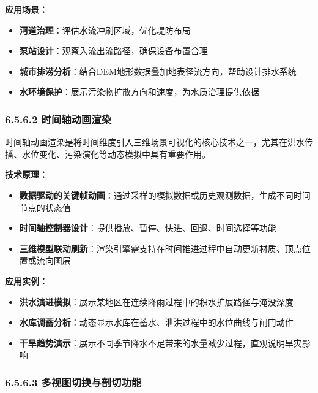 \textbf{应用场景：}

\begin{itemize}
\tightlist
\item
  \textbf{河道治理}：评估水流冲刷区域，优化堤防布局
\item
  \textbf{泵站设计}：观察入流出流路径，确保设备布置合理
\item
  \textbf{城市排涝分析}：结合DEM地形数据叠加地表径流方向，帮助设计排水系统
\item
  \textbf{水环境保护}：展示污染物扩散方向和速度，为水质治理提供依据
\end{itemize}

\subsubsection{6.5.6.2
时间轴动画渲染}\label{ux65f6ux95f4ux8f74ux52a8ux753bux6e32ux67d3}

时间轴动画渲染是将时间维度引入三维场景可视化的核心技术之一，尤其在洪水传播、水位变化、污染演化等动态模拟中具有重要作用。

\textbf{技术原理：}

\begin{itemize}
\tightlist
\item
  \textbf{数据驱动的关键帧动画}：通过采样的模拟数据或历史观测数据，生成不同时间节点的状态值
\item
  \textbf{时间轴控制器设计}：提供播放、暂停、快进、回退、时间选择等功能
\item
  \textbf{三维模型联动刷新}：渲染引擎需支持在时间推进过程中自动更新材质、顶点位置或流向图层
\end{itemize}

\textbf{应用实例：}

\begin{itemize}
\tightlist
\item
  \textbf{洪水演进模拟}：展示某地区在连续降雨过程中的积水扩展路径与淹没深度
\item
  \textbf{水库调蓄分析}：动态显示水库在蓄水、泄洪过程中的水位曲线与闸门动作
\item
  \textbf{干旱趋势演示}：展示不同季节降水不足带来的水量减少过程，直观说明旱灾影响
\end{itemize}

\subsubsection{6.5.6.3
多视图切换与剖切功能}\label{ux591aux89c6ux56feux5207ux6362ux4e0eux5256ux5207ux529fux80fd}


